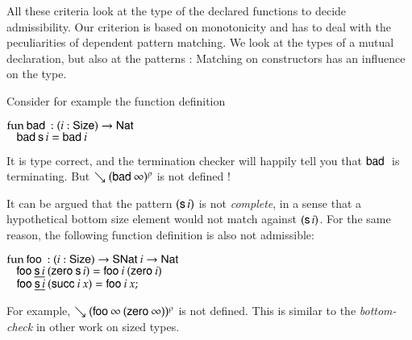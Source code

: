 All these criteria look at the type of the declared functions to decide admissibility.
Our criterion is based on monotonicity and has to deal with the peculiarities of
dependent pattern matching. We look at the types of a mutual declaration, but 
also at the patterns : Matching on constructors has an influence on the type.  

Consider for example the function definition
\begin{bsp}
$\mathrm{fun}\: \mathsf{bad}\: : ( i : \mathsf{Size} ) \rightarrow{\mathsf{Nat}\:}$\\
$\hspace*{3mm} \mathsf{bad}\: \mathsf{s}\, i = \mathsf{bad}\: i $ 
\end{bsp}
It is type correct, and the termination checker will happily tell you that $\mathsf{bad}\:$ is terminating.
But $\searrow (\mathsf{bad}\: \infty)^{\rho}$ is not defined !

It can be argued that the pattern $(\mathsf{s}\, i)$ is not \emph{complete}, in a sense that 
a hypothetical bottom size element would not match against $(\mathsf{s}\, i)$. 
For the same reason, the following function definition is also not admissible:
\begin{bsp}
$\mathrm{fun}\: \mathsf{foo}\: : ( i : \mathsf{Size} ) \rightarrow{\mathsf{SNat}\:i \rightarrow\mathsf{Nat}\:}$\\
$\hspace*{3mm} \mathsf{foo}\: \underline{\mathsf{s}\, i} \: (\mathsf{zero}\: \mathsf{s}\, i) = \mathsf{foo}\: i \: (\mathsf{zero}\: i)$\\
$\hspace*{3mm} \mathsf{foo}\: \underline{\mathsf{s}\, i}\: (\mathsf{succ}\: i \: x) = \mathsf{foo}\: i \: x;$
\end{bsp}
For example, $\searrow (\mathsf{foo}\: \infty \: (\mathsf{zero}\: \infty))^{\rho}$ is not defined.
This is similar to the \emph{bottom-check} \cite{hughes96proving} in other work on sized types.

